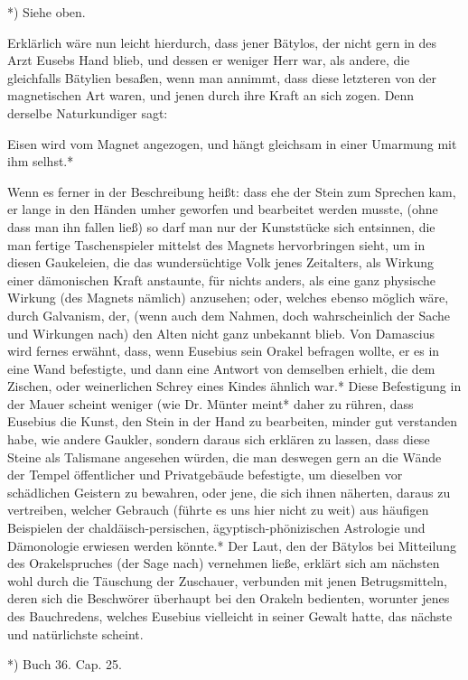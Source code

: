 \documentclass[a4paper, 11pt, oneside, polutonikogreek, german]{article}
\begin{document}
*) Siehe oben.

Erklärlich wäre nun leicht hierdurch, dass jener Bätylos, der nicht gern in des Arzt Eusebs Hand blieb, und dessen er weniger Herr war, als andere, die gleichfalls Bätylien besaßen, wenn man annimmt, dass diese letzteren von der magnetischen Art waren, und jenen durch ihre Kraft an sich zogen. Denn derselbe Naturkundiger sagt:

Eisen wird vom Magnet angezogen, und hängt gleichsam in einer Umarmung mit ihm selhst.*

Wenn es ferner in der Beschreibung heißt: dass ehe der Stein zum Sprechen kam, er lange in den Händen umher geworfen und bearbeitet werden musste, (ohne dass man ihn fallen ließ) so darf man nur der Kunststücke sich entsinnen, die man fertige Taschenspieler mittelst des Magnets hervorbringen sieht, um in diesen Gaukeleien, die das wundersüchtige Volk jenes Zeitalters, als Wirkung einer dämonischen Kraft anstaunte, für nichts anders, als eine ganz physische Wirkung (des Magnets nämlich) anzusehen; oder, welches ebenso möglich wäre, durch Galvanism, der, (wenn auch dem Nahmen, doch wahrscheinlich der Sache und Wirkungen nach) den Alten nicht ganz unbekannt blieb. Von Damascius wird fernes erwähnt, dass, wenn Eusebius sein Orakel befragen wollte, er es in eine Wand befestigte, und dann eine Antwort von demselben erhielt, die dem Zischen, oder weinerlichen Schrey eines Kindes ähnlich war.* Diese Befestigung in der Mauer scheint weniger (wie Dr. Münter meint* daher zu rühren, dass Eusebius die Kunst, den Stein in der Hand zu bearbeiten, minder gut verstanden habe, wie andere Gaukler, sondern daraus sich erklären zu lassen, dass diese Steine als Talismane angesehen würden, die man deswegen gern an die Wände der Tempel öffentlicher und Privatgebäude befestigte, um dieselben vor schädlichen Geistern zu bewahren, oder jene, die sich ihnen näherten, daraus zu vertreiben, welcher Gebrauch (führte es uns hier nicht zu weit) aus häufigen Beispielen der chaldäisch-persischen, ägyptisch-phönizischen Astrologie und Dämonologie erwiesen werden könnte.* Der Laut, den der Bätylos bei Mitteilung des Orakelspruches (der Sage nach) vernehmen ließe, erklärt sich am nächsten wohl durch die Täuschung der Zuschauer, verbunden mit jenen Betrugsmitteln, deren sich die Beschwörer überhaupt bei den Orakeln bedienten, worunter jenes des Bauchredens, welches Eusebius vielleicht in seiner Gewalt hatte, das nächste und natürlichste scheint.

*) Buch 36. Cap. 25.
\end{document}
